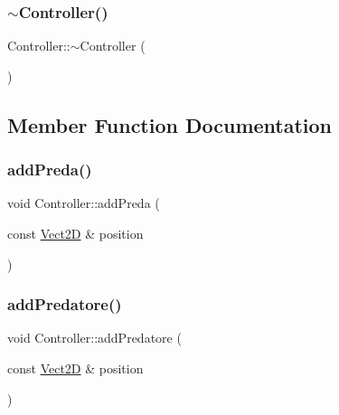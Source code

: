 \mbox{\label{classController_a0ab87934c4f7a266cfdb86e0f36bc1b5_a0ab87934c4f7a266cfdb86e0f36bc1b5}} 
\subsubsection{\texorpdfstring{$\sim$\+Controller()}{~Controller()}}
{\footnotesize\ttfamily Controller\+::$\sim$\+Controller (\begin{DoxyParamCaption}{ }\end{DoxyParamCaption})}



\subsection{Member Function Documentation}
\mbox{\label{classController_ad1cbf75efaef06838c322c0d11deb473_ad1cbf75efaef06838c322c0d11deb473}} 
\subsubsection{\texorpdfstring{add\+Preda()}{addPreda()}}
{\footnotesize\ttfamily void Controller\+::add\+Preda (\begin{DoxyParamCaption}\item[{const \hyperlink{classVect2D}{Vect2D} \&}]{position }\end{DoxyParamCaption})}

\mbox{\label{classController_a38346ab691e6d83dec69c3d60839d414_a38346ab691e6d83dec69c3d60839d414}} 
\subsubsection{\texorpdfstring{add\+Predatore()}{addPredatore()}}
{\footnotesize\ttfamily void Controller\+::add\+Predatore (\begin{DoxyParamCaption}\item[{const \hyperlink{classVect2D}{Vect2D} \&}]{position }\end{DoxyParamCaption})}

